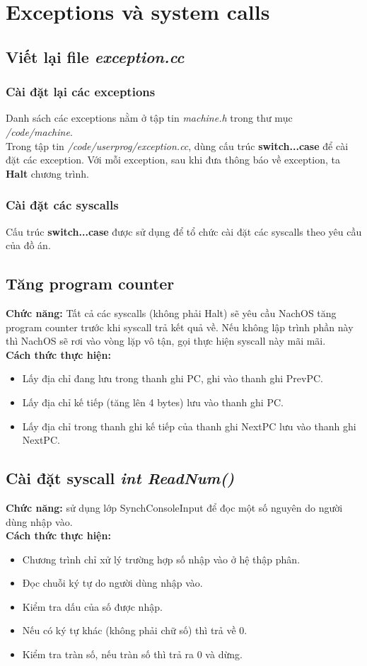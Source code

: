 \section{Exceptions và system calls}
\subsection{Viết lại file \textit{exception.cc}}
\subsubsection{Cài đặt lại các exceptions}
Danh sách các exceptions nằm ở tập tin \textit{machine.h} trong thư mục \textit{/code/machine}.\\
Trong tập tin \textit{/code/userprog/exception.cc}, dùng cấu trúc \textbf{switch...case} để cài đặt các exception. Với mỗi exception, sau khi đưa thông báo về exception, ta \textbf{Halt} chương trình.
\subsubsection{Cài đặt các syscalls}
Cấu trúc \textbf{switch...case} được sử dụng để tổ chức cài đặt các syscalls theo yêu cầu của đồ án.

\subsection{Tăng program counter}
\textbf{Chức năng:} Tất cả các syscalls (không phải Halt) sẽ yêu cầu NachOS tăng program counter trước khi syscall trả kết quả về. Nếu không lập trình phần này thì NachOS sẽ rơi vào vòng lặp vô tận, gọi thực hiện syscall này mãi mãi.\\
\textbf{Cách thức thực hiện:}
\begin{itemize}
\item Lấy địa chỉ đang lưu trong thanh ghi PC, ghi vào thanh ghi PrevPC.
\item Lấy địa chỉ kế tiếp (tăng lên 4 bytes) lưu vào thanh ghi PC.
\item Lấy địa chỉ trong thanh ghi kế tiếp của thanh ghi NextPC lưu vào thanh ghi NextPC.
\end{itemize}

\subsection{Cài đặt syscall \textit{int ReadNum()}}
\textbf{Chức năng:} sử dụng lớp SynchConsoleInput để đọc một số nguyên do người dùng nhập vào.\\
\textbf{Cách thức thực hiện:}
\begin{itemize}
\item Chương trình chỉ xử lý trường hợp số nhập vào ở hệ thập phân.
\item Đọc chuỗi ký tự do người dùng nhập vào.
\item Kiểm tra dấu của số được nhập.
\item Nếu có ký tự khác (không phải chữ số) thì trả về 0.
\item Kiểm tra tràn số, nếu tràn số thì trả ra 0 và dừng.
\end{itemize}

